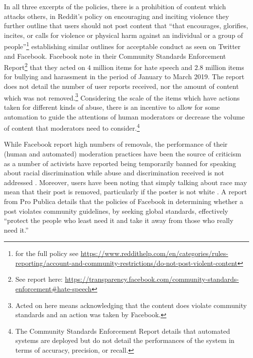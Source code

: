 In all three excerpts of the policies, there is a prohibition of content which attacks others, in Reddit's policy on encouraging and inciting violence they further outline that users should not post content that ``that encourages, glorifies, incites, or calls for violence or physical harm against an individual or a group of people''\footnote{for the full policy see \url{https://www.reddithelp.com/en/categories/rules-reporting/account-and-community-restrictions/do-not-post-violent-content}}
establishing similar outlines for acceptable conduct as seen on Twitter and Facebook. Facebook note in their Community Standards Enforcement Report\footnote{See report here: \url{https://transparency.facebook.com/community-standards-enforcement\#hate-speech}} that they acted on $4$ million items for hate speech and $2.8$ million items for bullying and harassment in the period of January to March 2019. The report does not detail the number of user reports received, nor the amount of content which was not removed.\footnote{Acted on here means acknowledging that the content does violate community standards and an action was taken by Facebook.} Considering the scale of the items which have actions taken for different kinds of abuse, there is an incentive to allow for some automation to guide the attentions of human moderators or decrease the volume of content that moderators need to consider.\footnote{The Community Standards Enforcement Report details that automated systems are deployed but do not detail the performances of the system in terms of accuracy, precision, or recall.}

While Facebook report high numbers of removals, the performance of their (human and automated) moderation practices have been the source of criticism as a number of activists have reported being temporarily banned for speaking about racial discrimination while abuse and discrimination received is not addressed \citep{Sharif:2019}.
Moreover, users have been noting that simply talking about race may mean that their post is removed, particularly if the poster is not white \citep{Guynn:2019}. A report from Pro Publica details that the policies of Facebook in determining whether a post violates community guidelines, by seeking global standards, effectively ``protect the people who least need it and take it away from those who really need it.'' \citep{Angwin:2017}


